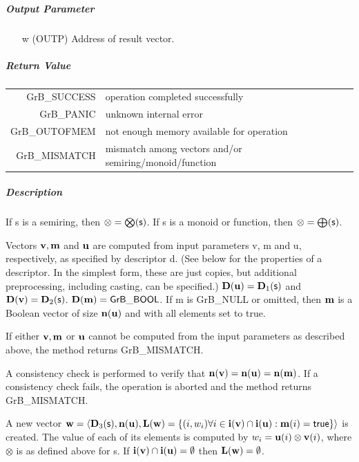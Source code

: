 \documentclass[11pt]{extarticle}
\begin{document}
\subparagraph{Output Parameter}

\begin{itemize}
	\item[{\sf w}] ({\sf OUTP}) Address of result vector.
\end{itemize}

\subparagraph{Return Value}

\begin{tabular}{rl} 
{\sf GrB\_SUCCESS} 	& operation completed successfully \\
{\sf GrB\_PANIC}	& unknown internal error \\
{\sf GrB\_OUTOFMEM}	& not enough memory available for operation \\
{\sf GrB\_MISMATCH}	& mismatch among vectors and/or semiring/monoid/function
\end{tabular}

\subparagraph{Description}

If {\sf s} is a semiring, then $\otimes = \bigotimes({\sf s})$. 
If {\sf s} is a monoid or function, then $\otimes = \bigoplus({\sf s})$.

Vectors ${\bf v}, {\bf m}$ and ${\bf u}$ are computed from
input parameters {\sf v}, {\sf m} and {\sf u}, respectively, as specified
by descriptor {\sf d}. (See below for the properties of a descriptor. In
the simplest form, these are just copies, but additional preprocessing,
including casting, can be specified.)  $\bold{D}({\bf u}) =
\bold{D}_1({\sf s})$ and $\bold{D}({\bf v}) = \bold{D}_2({\sf s})$.
$\bold{D}({\bf m}) = {\sf GrB\_BOOL}$.  If {\sf m} is {\sf GrB\_NULL} or omitted,
then ${\bf m}$ is a Boolean vector of size $\bold{n}({\bf u})$
and with all elements set to {\sf true}.

If either ${\bf v}, {\bf m}$ or ${\bf u}$ cannot be computed
from the input parameters as described above, the method returns {\sf
GrB\_MISMATCH}.

A consistency check is performed to verify that $\bold{n}({\bf v})
= \bold{n}({\bf u}) = \bold{n}({\bf m})$. If a consistency
check fails, the operation is aborted and the method returns {\sf
GrB\_MISMATCH}.

A new vector ${\bf w} = \langle \bold{D}_3({\sf s}),
\bold{n}({\bf u}), \bold{L}({\bf w}) = \{(i,w_i)  \forall i \in
{\bf i}({\bf v}) \cap {\bf i}({\bf u}) : {\bf m}(i)
= {\sf true} \} \rangle$ is created.  The value of each of its
elements is computed by $w_i = {\bf u}(i) \otimes {\bf v}(i)$,
where $\otimes$ is as defined above for {\sf s}.
If ${\bf i}({\bf v}) \cap {\bf i}({\bf u}) = \emptyset$
then $\bold{L}({\bf w}) = \emptyset$.
\end{document}
